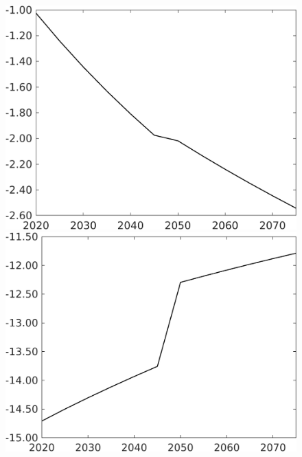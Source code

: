 \documentclass[12pt]{article}
\begin{document}
\begin{figure}[h!!]
\begin{minipage}[]{0.32\textwidth}
	\end{minipage}	
	\begin{minipage}[]{0.32\textwidth}
		\includegraphics[width=1\textwidth]{../../codding_model/own_basedOnFried/optimalPol_010922_revision/figures/all_13Sept22/CompTaufPER_bytaul_Reg0_Lf_spillover0_nsk0_xgr0_knspil1_sep1_LFlimit1_emsbase0_countec0_GovRev0_etaa0.79_lgd0.png}
	\end{minipage}		
	\begin{minipage}[]{0.32\textwidth}
		\includegraphics[width=1\textwidth]{../../codding_model/own_basedOnFried/optimalPol_010922_revision/figures/all_13Sept22/CompTaufPER_bytaul_Reg0_Lg_spillover0_nsk0_xgr0_knspil1_sep1_LFlimit1_emsbase0_countec0_GovRev0_etaa0.79_lgd0.png}

\end{minipage}
\end{figure}
\end{document}
